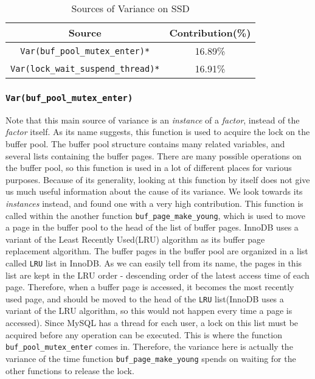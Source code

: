\begin{table}[h!]
\centering
\begin{tabular}{|c|c|} \hline
Source&Contribution(\%)\\ \hline
\texttt{Var(buf\_pool\_mutex\_enter)*}&16.89\%\\ \hline
\texttt{Var(lock\_wait\_suspend\_thread)*}&16.91\%\\
\hline\end{tabular}
\caption{Sources of Variance on SSD}
\label{tab:source-ssd}
\end{table}

\subsubsection{\texttt{Var(buf\_pool\_mutex\_enter)}}
Note that this main source of variance is an \textit{instance} of a
\textit{factor}, instead of the \textit{factor} itself. As its name
suggests, this function is used to acquire the lock on the buffer pool.
The buffer pool structure contains many related variables, and several
lists containing the buffer pages. There are many possible operations on
the buffer pool, so this function is used in a lot of different places for
various purposes. Because of its generality, looking at this function by
itself does not give us much useful information about the cause of its
variance. We look towards its \textit{instances} instead, and found one 
with a very high contribution. This function is called within the another 
function \texttt{buf\_page\_make\_young}, which is used to move a page
in the buffer pool to the head of the list of buffer pages. InnoDB uses a
variant of the Least Recently Used(LRU) algorithm as its buffer page
replacement algorithm. The buffer pages in the buffer pool are organized in a
list called \texttt{LRU} list in InnoDB. As we can easily tell from its name,
the pages in this list are kept in the LRU order - descending order of the
latest access time of each page. Therefore, when a buffer page is accessed, it
becomes the most recently used page, and should be moved to the head of the
\texttt{LRU} list(InnoDB uses a variant of the LRU algorithm, so this would not
happen every time a page is accessed). Since MySQL has a thread for each user,
a lock on this list must be acquired before any operation can be executed. This
is where the function \texttt{buf\_pool\_mutex\_enter} comes in. Therefore, the
variance here is actually the variance of the time function \texttt{buf\_page\_make\_young} spends on waiting for the other functions to release the lock.

